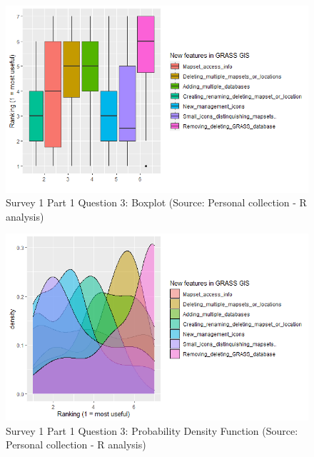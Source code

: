 \documentclass[a4paper,10pt,twoside]{article}
\begin{document}
\vspace{0.3cm}
\begin{figure}[hbt!] 
\begin{center}
\includegraphics[width=15.5cm]{../surveys/analyzed_data/survey1_part1_question3_boxplot_r.png} 
\caption[Survey 1 Part 1 Question 3: Boxplot]{Survey 1 Part 1 Question 3: Boxplot (Source: Personal collection - R analysis)}
\label{fig:survey1_part1_question3_boxplot_r}
\end{center}
\end{figure}

\vspace{0.3cm}
\begin{figure}[hbt!] 
\begin{center}
\includegraphics[width=15.5cm]{../surveys/analyzed_data/survey1_part1_question3_pdf.png} 
\caption[Survey 1 Part 1 Question 3: Probability Density Function]{Survey 1 Part 1 Question 3: Probability Density Function (Source: Personal collection - R analysis)}
\label{fig:survey1_part1_question3_pdf}
\end{center}
\end{figure}
\end{document}
